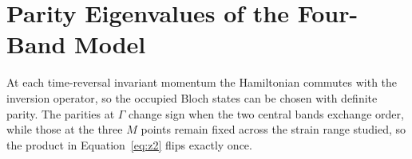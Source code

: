 \chapter{Parity Eigenvalues of the Four-Band Model}
\label{app:a}

At each time-reversal invariant momentum the Hamiltonian commutes with the inversion operator,
so the occupied Bloch states can be chosen with definite parity. The parities at $\Gamma$
change sign when the two central bands exchange order, while those at the three $M$ points
remain fixed across the strain range studied, so the product in Equation~\eqref{eq:z2} flips
exactly once.
